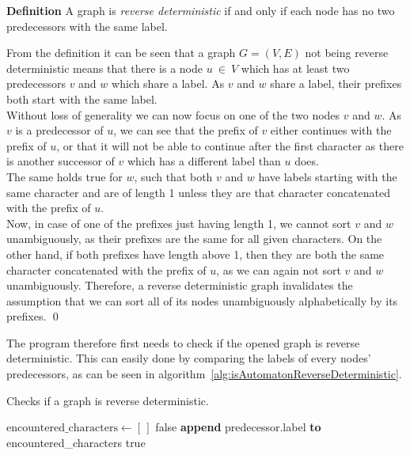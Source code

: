 \documentclass[a4paper,12pt,twoside,BCOR=10mm]{scrbook}
\begin{document}
\textbf{Definition} A graph is \textit{reverse deterministic} if and only if each node has no two predecessors with the same label.

From the definition it can be seen that a graph $ G = (V, E) $ not being reverse deterministic means that there 
is a node $ u {\: \in \:} V $ which has at least two predecessors $ v $ and $ w $ which share a label. 
As $ v $ and $ w $ share a label, their prefixes both start with the same label. \\
Without loss of generality we can now focus on one of the two nodes $ v $ and $ w $. 
As $ v $ is a predecessor of $ u $, we can see that the 
prefix of $ v $ either continues with the prefix of $ u $, 
or that it will not be able to continue after the first character 
as there is another successor of $ v $ which has a different label than $ u $ does. \\
The same holds true for $ w $, such that both $ v $ and $ w $ have labels starting 
with the same character and are of length 1 unless they are that character concatenated 
with the prefix of $ u $. \\
Now, in case of one of the prefixes just having length 1, we cannot sort $ v $ and $ w $ 
unambiguously, as their prefixes are the same for all given characters. 
On the other hand, if both prefixes have length above 1, then they are both 
the same character concatenated with the prefix of $ u $, as we can again not sort $ v $ and $ w $ 
unambiguously. 
Therefore, a reverse deterministic graph invalidates the assumption that we can sort 
all of its nodes unambiguously alphabetically by its prefixes. \qed

The program therefore first needs to check if the opened graph is reverse deterministic. 
This can easily done by comparing the labels of every nodes' predecessors, as can be seen 
in algorithm~\ref{alg:isAutomatonReverseDeterministic}.

\begin{algorithm}
\caption[Check if a graph is reverse deterministic]{Checks if a graph is reverse deterministic.}
\label{alg:isAutomatonReverseDeterministic}
\begin{algorithmic}[1]
	\State $ \textrm{encountered\_characters} \gets [ \, ] $
			\State \Return false
		\Else
			\State \textbf{append} predecessor.label \textbf{to} encountered\_characters
		\EndIf
	\EndFor
\EndFor
\State \Return true
\end{algorithmic}
\end{algorithm}
\end{document}
